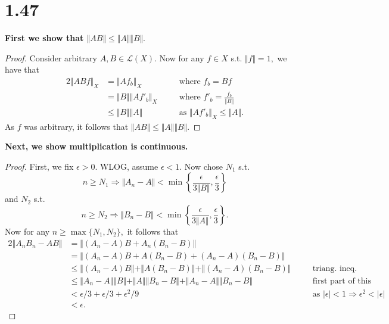 \documentclass[10pt]{article}
\begin{document}
 \section*{1.47}
\textbf{First we show that $\Vert AB\Vert \le\Vert A\Vert\Vert B\Vert.$}

\begin{proof}
    Consider arbitrary $A,B\in\mathscr{L}(X).$ Now for any $f\in X$ s.t. $\Vert f\Vert = 1,$ we have that
    \begin{alignat*}{2}
        \Vert ABf\Vert_X &= \Vert Af_b\Vert_X &&\text{where $f_b=Bf$}\\
        &= \Vert B\Vert \Vert Af'_b\Vert_X \quad&&\text{where $f'_b=\frac{f_b}{\Vert B\Vert}$}\\
        &\le\Vert B\Vert\Vert A\Vert &&\text{as $\Vert Af'_b\Vert_X\le\Vert A\Vert.$}
    \end{alignat*}
    As $f$ was arbitrary, it follows that $\Vert AB\Vert \le \Vert A\Vert \Vert B\Vert.$
\end{proof}

\noindent
\textbf{Next, we show multiplication is continuous.}

\begin{proof}
    First, we fix $\epsilon > 0.$ WLOG, assume $\epsilon <1.$ Now chose $N_1$ s.t.
    \[n\ge N_1 \Rightarrow \Vert A_n-A\Vert < \min \left\{\frac{\epsilon}{3\Vert B\Vert}, \frac{\epsilon}{3} \right\}\]
    and $N_2$ s.t.
    \[n\ge N_2 \Rightarrow \Vert B_n-B\Vert <  \min \left\{\frac{\epsilon}{3\Vert A\Vert}, \frac{\epsilon}{3} \right\}.\]
    Now for any $n\ge\max\{N_1, N_2\},$ it follows that
    \begin{alignat*}{2}
        \Vert A_nB_n-AB\Vert &= \Vert (A_n-A)B + A_n(B_n - B)\Vert\\
        &=  \Vert (A_n-A)B + A(B_n-B) + (A_n-A)(B_n-B)\Vert\\
        &\le \Vert (A_n-A)B\Vert + \Vert A(B_n-B)\Vert + \Vert(A_n-A)(B_n-B)\Vert \quad&&\text{triang. ineq.}\\
        &\le\Vert A_n-A\Vert\Vert B\Vert + \Vert A\Vert\Vert B_n-B\Vert + \Vert A_n-A\Vert\Vert B_n-B\Vert &&\text{first part of this prob.}\\
        &< \epsilon/3 + \epsilon/3 + \epsilon^2/9 &&\text{as $|\epsilon| < 1\Rightarrow \epsilon^2 < |\epsilon|$}\\
        &< \epsilon.
    \end{alignat*}
\end{proof}
\end{document}
